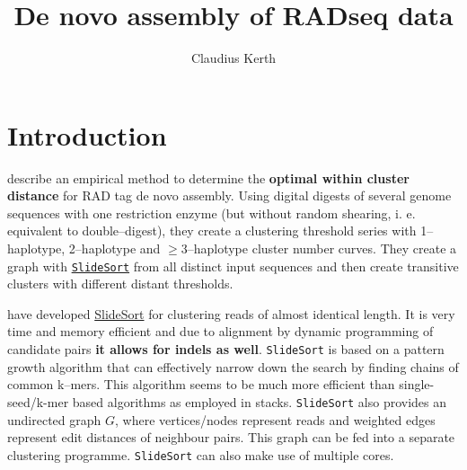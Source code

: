 \documentclass{article}\usepackage[]{graphicx}\usepackage[]{color}
\begin{document}




\title{De novo assembly of RADseq data}


\author{Claudius Kerth}

\maketitle



\section{Introduction}

\cite{Ilut2014} describe an empirical method to determine the \textbf{optimal within cluster distance} for RAD tag de novo assembly. Using digital digests of several genome sequences with one restriction enzyme (but without random shearing, i. e. equivalent to double--digest), they create a clustering threshold series with 1--haplotype, 2--haplotype and $\ge$3--haplotype cluster number curves. They create a \gls{graph} with \href{http://cbrc3.cbrc.jp/~shimizu/slidesort/index.php?SlideSort}{\texttt{SlideSort}} from all distinct input sequences and then create \gls{transitive clusters} with different distant thresholds.

\cite{Shimizu2011} have developed \href{http://cbrc3.cbrc.jp/~shimizu/slidesort/index.php?SlideSort}{SlideSort} for clustering reads of almost identical length. It is very time and memory efficient and due to alignment by dynamic programming of candidate pairs \textbf{it allows for indels as well}. \texttt{SlideSort} is based on a pattern growth algorithm that can effectively narrow down the search by finding chains of common k--mers. This algorithm seems to be much more efficient than single-seed/k-mer based algorithms as employed in stacks. \texttt{SlideSort} also provides an undirected graph $G$, where vertices/nodes represent reads and weighted edges represent edit distances of neighbour pairs. This graph can be fed into a separate clustering programme. \texttt{SlideSort} can also make use of multiple cores.
\end{document}
